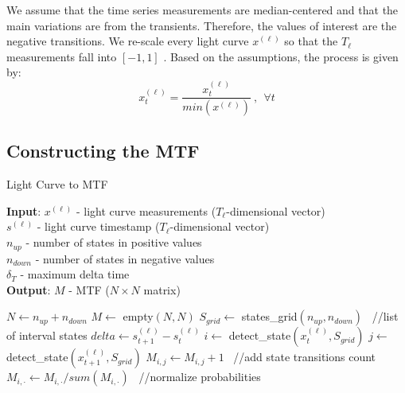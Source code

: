 We assume that the time series measurements are median-centered and that the main variations are from the transients. Therefore, the values of interest are the negative transitions. We re-scale every light curve $x^{(\ell)}$ so that the $T_{\ell}$ measurements fall into $[-1,1]$ \citep{shallue2018identifying}. Based on the assumptions, the process is given by:
\begin{equation} \label{rep:pre}
    x_{t}^{(\ell)} = \frac{x_{t}^{(\ell)}}{min(x^{(\ell)})} \ , \ \ \forall t
\end{equation}


\subsection{Constructing the MTF}
\begin{algorithm}[!t] 
\caption{Light Curve to MTF}
\label{alg:lc_to_mtf}
\hspace*{\algorithmicindent} \textbf{Input}: $x^{(\ell)}$ - light curve measurements ($T_{\ell}$-dimensional vector) \\
\hspace*{\algorithmicindent} \hspace{0.1\textwidth} $s^{(\ell)}$ - light curve timestamp ($T_{\ell}$-dimensional vector) \\
\hspace*{\algorithmicindent} \hspace{0.1\textwidth} $n_{up}$ - number of states in positive values \\
\hspace*{\algorithmicindent} \hspace{0.1\textwidth} $n_{down}$ - number of states in negative values \\
\hspace*{\algorithmicindent} \hspace{0.1\textwidth} $\delta_T$ - maximum delta time \\ %
\hspace*{\algorithmicindent} \textbf{Output}:  $M$ - MTF ($N \times N$ matrix)
\begin{algorithmic}[1]
\State $N \gets n_{up}+ n_{down}$  %
\State $M \gets $ empty$(N, N)$
\State $S_{grid} \gets $ states\_grid$(n_{up},n_{down})$ \ //list of interval states
    \State $delta \gets s^{(\ell)}_{t+1}-s^{(\ell)}_t$
        \State $i \gets $ detect\_state$(x^{(\ell)}_{t},S_{grid})$
        \State $j \gets $ detect\_state$(x^{(\ell)}_{t+1},S_{grid})$
        \State $M_{i,j} \gets M_{i,j} + 1$ \ //add state transitions count
    \EndIf
\EndFor
{}  %
    \State $M_{i,\cdot} \gets M_{i,\cdot}/ sum(M_{i,\cdot})$ \ //normalize probabilities  %
\EndFor
\end{algorithmic} 
\end{algorithm}

